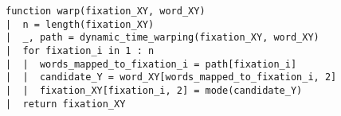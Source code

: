 \documentclass[doc,biblatex]{apa7}
\begin{document}
\begin{verbatim}
function warp(fixation_XY, word_XY)
|  n = length(fixation_XY)
|  _, path = dynamic_time_warping(fixation_XY, word_XY)
|  for fixation_i in 1 : n
|  |  words_mapped_to_fixation_i = path[fixation_i]
|  |  candidate_Y = word_XY[words_mapped_to_fixation_i, 2]
|  |  fixation_XY[fixation_i, 2] = mode(candidate_Y)
|  return fixation_XY
\end{verbatim}
\end{document}
